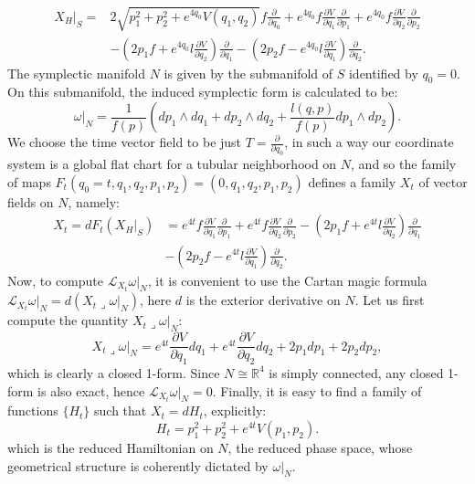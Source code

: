 \documentclass{article}
\numberwithin{equation}{section}
\theoremstyle{definition}
\newcommand{\R}{\mathbb{R}}
\newcommand{\inn}{\operatorname{\lrcorner}}
\newcommand{\pder}[2]{\frac{\partial #1}{\partial #2}}
\begin{document}
\begin{equation}
\begin{split}
    X_H|_S=&2\sqrt{p^2_1+p^2_2+e^{4q_0}V(q_1,q_2)}f\pder{}{q_0}+e^{4q_0}f\pder{V}{q_1}\pder{}{p_1}+e^{4q_0}f\pder{V}{q_2}\pder{}{p_2}\\
        &-\left(2p_1f+e^{4q_0}l\pder{V}{q_2}\right)\pder{}{q_1}-\left(2p_2f-e^{4q_0}l\pder{V}{q_1}\right)\pder{}{q_2}.
\end{split}
\end{equation}
The symplectic manifold $N$ is given by the submanifold of $S$ identified by $q_0=0$. On this submanifold, the induced symplectic form is calculated to be:
\begin{equation}
    \omega|_N=\frac{1}{f(p)}\left(dp_1\wedge dq_1+dp_2\wedge dq_2+\frac{l(q,p)}{f(p)}dp_1\wedge dp_2\right).
\end{equation}
We choose the time vector field to be just $T=\pder{}{q_0}$, in such a way our coordinate system is a global flat chart for a tubular neighborhood on $N$, and so the family of maps $F_{t}(q_0=t,q_1,q_2,p_1,p_2)=(0,q_1,q_2,p_1,p_2)$ defines a family ${X_t}$ of vector fields on $N$, namely:
\begin{equation}
\begin{split}
    X_t=dF_t(X_H|_S)&=e^{4t}f\pder{V}{q_1}\pder{}{p_1}+e^{4t}f\pder{V}{q_2}\pder{}{p_2}-\left(2p_1f+e^{4t}l\pder{V}{q_2}\right)\pder{}{q_1}\\
    &-\left(2p_2f-e^{4t}l\pder{V}{q_1}\right)\pder{}{q_2}.
\end{split}
\end{equation}
Now, to compute $\mathcal{L}_{X_t}\omega|_N$, it is convenient to use the Cartan magic formula $\mathcal{L}_{X_t}\omega|_N=d(X_t\inn\omega|_N)$, here $d$ is the exterior derivative on $N$. Let us first compute the quantity $X_t\inn\omega|_N$:
\begin{equation}
    X_t\inn\omega|_N=e^{4t}\pder{V}{q_1}dq_1+e^{4t}\pder{V}{q_2}dq_2+2p_1dp_1+2p_2dp_2,
\end{equation}
which is clearly a closed 1-form. Since $N\cong\R^4$ is simply connected, any closed 1-form is also exact, hence $\mathcal{L}_{X_t}\omega|_N=0$. Finally, it is easy to find a family of functions $\{H_t\}$ such that $X_t=dH_t$, explicitly:
\begin{equation}
    H_t=p_1^2+p_2^2+e^{4t}V(p_1,p_2).
\end{equation}
which is the reduced Hamiltonian on $N$, the reduced phase space, whose geometrical structure is coherently dictated by $\omega|_N$.
\end{document}
